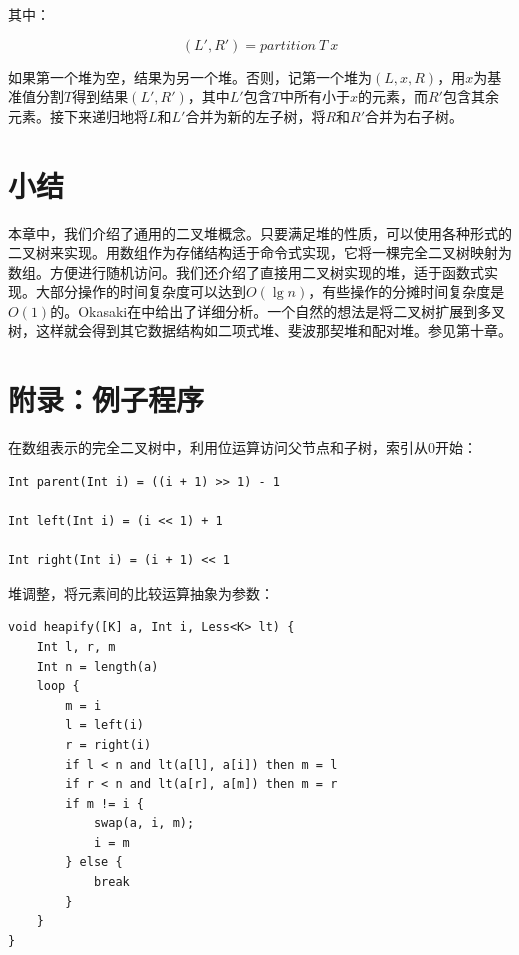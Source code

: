 \documentclass[b5paper]{ctexart}
\begin{document}
其中：

\[
  (L', R') = partition\ T\ x
\]

如果第一个堆为空，结果为另一个堆。否则，记第一个堆为$(L, x, R)$，用$x$为基准值分割$T$得到结果$(L', R')$，其中$L'$包含$T$中所有小于$x$的元素，而$R'$包含其余元素。接下来递归地将$L$和$L'$合并为新的左子树，将$R$和$R'$合并为右子树。

\section{小结}

本章中，我们介绍了通用的二叉堆概念。只要满足堆的性质，可以使用各种形式的二叉树来实现。用数组作为存储结构适于命令式实现，它将一棵完全二叉树映射为数组。方便进行随机访问。我们还介绍了直接用二叉树实现的堆，适于函数式实现。大部分操作的时间复杂度可以达到$O(\lg n)$，有些操作的分摊时间复杂度是$O(1)$的。Okasaki在\cite{okasaki-book}中给出了详细分析。一个自然的想法是将二叉树扩展到多叉树，这样就会得到其它数据结构如二项式堆、斐波那契堆和配对堆。参见第十章。

\begin{Exercise}
\end{Exercise}

\section{附录：例子程序}

在数组表示的完全二叉树中，利用位运算访问父节点和子树，索引从0开始：

\begin{lstlisting}[language = Bourbaki]
Int parent(Int i) = ((i + 1) >> 1) - 1

Int left(Int i) = (i << 1) + 1

Int right(Int i) = (i + 1) << 1
\end{lstlisting}

堆调整，将元素间的比较运算抽象为参数：

\begin{lstlisting}[language = Bourbaki]
void heapify([K] a, Int i, Less<K> lt) {
    Int l, r, m
    Int n = length(a)
    loop {
        m = i
        l = left(i)
        r = right(i)
        if l < n and lt(a[l], a[i]) then m = l
        if r < n and lt(a[r], a[m]) then m = r
        if m != i {
            swap(a, i, m);
            i = m
        } else {
            break
        }
    }
}
\end{lstlisting}
\end{document}
